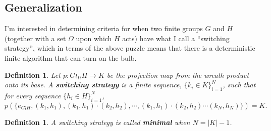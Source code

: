 \documentclass{article}
\numberwithin{equation}{subsection}
\newtheorem{definition}[theo]{Definition}
\begin{document}
\subsection{Generalization}
I'm interested in determining criteria for when two finite groups $G$ and $H$
(together with a set $\Omega$ upon which $H$ acts) have what I call a
``switching strategy'', which in terms of the above puzzle means that there
is a deterministic finite algorithm that can turn on the bulb.

\begin{definition}
  Let $p \colon G \wr_\Omega H \rightarrow K$ be the projection map from the
  wreath product onto its base.
  A \textbf{switching strategy} is a finite sequence, $\{k_i \in K\}_{i=1}^N$,
  such that for every sequence ${\{h_i \in H\}_{i=1}^N}$,
  \begin{equation}
    p(\{e_{G \wr H}, (k_1, h_1), (k_1, h_1)\cdot(k_2, h_2), \cdots, (k_1, h_1)\cdot(k_2, h_2)\cdots(k_N, h_N)\}) = K.
  \end{equation}
\end{definition}
\begin{definition}
  A switching strategy is called \textbf{minimal} when $N = |K| - 1$.
\end{definition}
\end{document}
